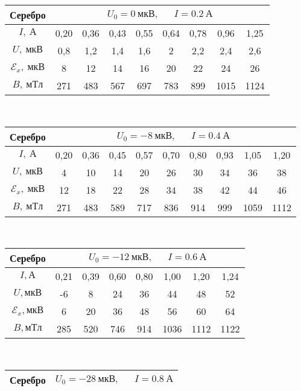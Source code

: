 \documentclass{lab}
\begin{document}
\begin{itemize}
\begin{table}[H]
	\centering
	\renewcommand{\arraystretch}{1.3}
{
	\footnotesize
\begin{tabular}{|c|cccccccc|}
	\hline
	Серебро 				& \multicolumn{8}{c|}{$ U_0 = 0~мкВ, ~~~~~~~ I = 0.2~А $} 		\\ \hline
	$ I,~А $				& 0,20	& 0,36	& 0,43	& 0,55	& 0,64	& 0,78	& 0,96	& 1,25	\\ \hline
	$ U,~мкВ $				& 0,8	& 1,2	& 1,4	& 1,6	& 2		& 2,2	& 2,4	& 2,6	\\ \hline
	$ \mathscr{E}_x,~мкВ $	& 8		& 12	& 14	& 16	& 20	& 22	& 24	& 26	\\ \hline
	$ B,~мТл $				& 271	& 483	& 567	& 697	& 783	& 899	& 1015	& 1124	\\ \hline
\end{tabular}
\\[0.1cm]
\begin{tabular}{|c|ccccccccc|}
	\hline
	Серебро 				& \multicolumn{9}{c|}{$ U_0 = -8~мкВ, ~~~~~~~ I = 0.4~А $} 				\\ \hline
	$ I,~А $				& 0,20	& 0,36	& 0,45	& 0,57	& 0,70	& 0,80	& 0,93	& 1,05	& 1,20	\\ \hline
	$ U,~мкВ $				& 4		& 10	& 14	& 20	& 26	& 30	& 34	& 36	& 38	\\ \hline
	$ \mathscr{E}_x,~мкВ $	& 12	& 18	& 22	& 28	& 34	& 38	& 42	& 44	& 46	\\ \hline
	$ B,~мТл $				& 271	& 483	& 589	& 717	& 836	& 914	& 999	& 1059	& 1112	\\ \hline
\end{tabular}
\\[0.1cm]
\begin{tabular}{|c|ccccccc|}
	\hline
	Серебро					& \multicolumn{7}{c|}{$ U_0 = -12~мкВ, ~~~~~~~ I = 0.6~А $} \\ \hline
	$I, А$					& 0,21	& 0,39	& 0,60	& 0,80	& 1,00	& 1,20	& 1,24		\\ \hline
	$U, мкВ$				& -6	& 8		& 24	& 36	& 44	& 48	& 52		\\ \hline
	$\mathscr{E}_x, мкВ$	& 6		& 20	& 36	& 48	& 56	& 60	& 64		\\ \hline
	$B, мТл$				& 285	& 520	& 746	& 914	& 1036	& 1112	& 1122		\\ \hline
\end{tabular}
\\[0.1cm]
\begin{tabular}{|c|ccccccc|}
	\hline
	Серебро					& \multicolumn{7}{c|}{$ U_0 = -28~мкВ, ~~~~~~~ I = 0.8~А $}	\\ \hline

\end{tabular}}
\end{table}
\end{itemize}
\end{document}

